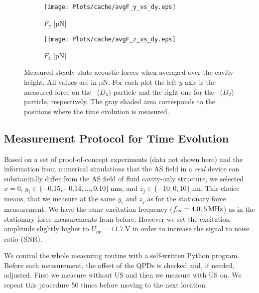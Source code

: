 \begin{figure}[H]
  \centering
  \begin{subfigure}{\figWidth}
    \centering
    \caption{$F_{y}$ [\si{\pico\newton}]}\label{subfig:TC-F_y}
    \texttt{[image: Plots/cache/avgF\_y\_vs\_dy.eps]}
  \end{subfigure}%
  \begin{subfigure}{\figWidth}
    \centering
    \caption{$F_{z}$ [\si{\pico\newton}]}\label{subfig:TC-F_z}
    \texttt{[image: Plots/cache/avgF\_z\_vs\_dy.eps]}
  \end{subfigure}%
  \caption{Measured steady-state acoustic forces when averaged over the cavity 
    height. All values are in \si{\pico\newton}. For each plot the left 
    $y$-axis is the measured force on the \Dfour~($D_{4}$) particle and the 
    right one for the \Dtwo~($D_{2}$) particle, respectively.
    The gray shaded area corresponds to the positions where the time evolution 
  is measured.}\label{fig:TC-averaged_forces_vs_dy}
\end{figure}

\subsection{Measurement Protocol for Time Evolution}

Based on a set of proof-of-concept experiments (data not shown here) and the 
information from numerical simulations that the AS field in a \emph{real} 
device can substantially differ from the AS field of fluid cavity-only 
structure, we selected $x = 0$, $y_{i} \in 
\{-0.15,-0.14,\dots,0.10\}\,\si{\mm}$, and $z_{j} \in \{-10,0,10\}\,\si{\um}$. 
This choice means, that we measure at the same $y_{i}$ and $z_{j}$ as for the 
stationary force measurement. We have the same excitation frequency ($\fex = 
\SI{4.015}{\MHz}$) as in the stationary force measurements from before. However 
we set the excitation amplitude slightly higher to $U_{\text{pp}} = 
\SI{11.7}{\volt}$ in order to increase the signal to noise ratio (SNR).

We control the whole measuring routine with a self-written Python program. 
Before each measurement, the offset of the QPDs is checked and, if needed, 
adjusted. First we measure without US and then we measure with US on. We repeat 
this procedure 50 times before moving to the next location.


